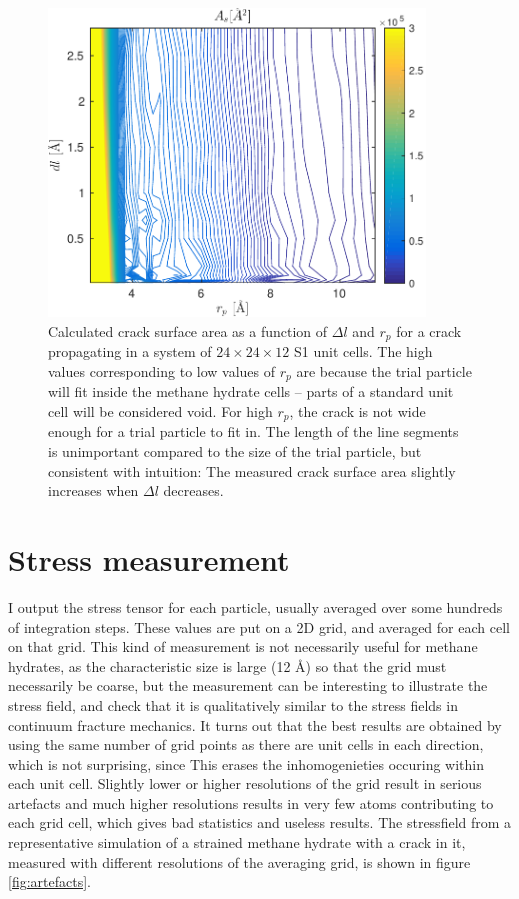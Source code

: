 \begin{figure}
\centering
\includegraphics[width=10cm]{../figures/thesis/crack_tracer_test.pdf}
\caption{Calculated crack surface area as a function of $\Delta l$ and $r_p$ for a crack propagating in a system of $24\times 24 \times 12$ S1 unit cells. The high values corresponding to low values of $r_p$ are because the trial particle will fit inside the methane hydrate cells -- parts of a standard unit cell will be considered void. For high $r_p$, the crack is not wide enough for a trial particle to fit in. The length of the line segments is unimportant compared to the size of the trial particle, but consistent with intuition: The measured crack surface area slightly increases when $\Delta l$ decreases.}
\label{fig:crack_trace_test}
\end{figure}


\section{Stress measurement}
I output the stress tensor for each particle, usually averaged over some hundreds of integration steps. These values are put on a 2D grid, and averaged for each cell on that grid. This kind of measurement is not necessarily useful for methane hydrates, as the characteristic size is large (12 Å) so that the grid must necessarily be coarse, but the measurement can be interesting to illustrate the stress field, and check that it is qualitatively similar to the stress fields in continuum fracture mechanics. It turns out that the best results are obtained by using the same number of grid points as there are unit cells in each direction, which is not surprising, since This erases the inhomogenieties occuring within each unit cell. Slightly lower or higher resolutions of the grid result in serious artefacts and much higher resolutions results in very few atoms contributing to each grid cell, which gives bad statistics and useless results. The stressfield from a representative simulation of a strained methane hydrate with a crack in it, measured with different resolutions of the averaging grid, is shown in figure \ref{fig:artefacts}.

